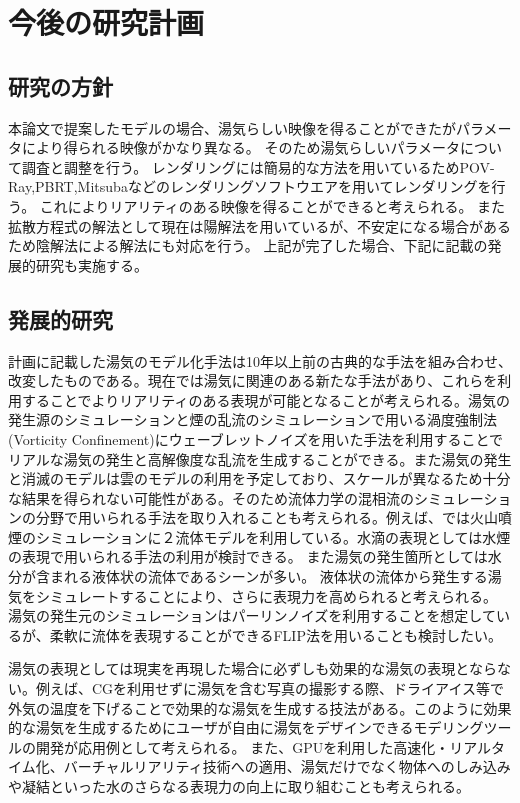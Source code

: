\section{今後の研究計画}

\subsection{研究の方針}

本論文で提案したモデルの場合、湯気らしい映像を得ることができたがパラメータにより得られる映像がかなり異なる。
そのため湯気らしいパラメータについて調査と調整を行う。
レンダリングには簡易的な方法を用いているためPOV-Ray,PBRT,Mitsubaなどのレンダリングソフトウエアを用いてレンダリングを行う。
これによりリアリティのある映像を得ることができると考えられる。
また拡散方程式の解法として現在は陽解法を用いているが、不安定になる場合があるため陰解法による解法にも対応を行う。
上記が完了した場合、下記に記載の発展的研究も実施する。

\subsection{発展的研究}
計画に記載した湯気のモデル化手法は10年以上前の古典的な手法を組み合わせ、改変したものである。現在では湯気に関連のある新たな手法があり、これらを利用することでよりリアリティのある表現が可能となることが考えられる。湯気の発生源のシミュレーションと煙の乱流のシミュレーションで用いる渦度強制法(Vorticity Confinement)にウェーブレットノイズを用いた手法\cite{Kim2008}を利用することでリアルな湯気の発生と高解像度な乱流を生成することができる。また湯気の発生と消滅のモデルは雲のモデルの利用を予定しており、スケールが異なるため十分な結果を得られない可能性がある。そのため流体力学の混相流のシミュレーションの分野で用いられる手法を取り入れることも考えられる。例えば、\cite{Mizuno2003}では火山噴煙のシミュレーションに２流体モデルを利用している。水滴の表現としては水煙の表現で用いられる手法\cite{Nielsen2013}の利用が検討できる。
また湯気の発生箇所としては水分が含まれる液体状の流体であるシーンが多い。
液体状の流体から発生する湯気をシミュレートすることにより、さらに表現力を高められると考えられる。
湯気の発生元のシミュレーションはパーリンノイズを利用することを想定しているが、柔軟に流体を表現することができるFLIP法\cite{Zhu2005}を用いることも検討したい。

湯気の表現としては現実を再現した場合に必ずしも効果的な湯気の表現とならない。例えば、CGを利用せずに湯気を含む写真の撮影する際、ドライアイス等で外気の温度を下げることで効果的な湯気を生成する技法がある。このように効果的な湯気を生成するためにユーザが自由に湯気をデザインできるモデリングツールの開発が応用例として考えられる。
また、GPUを利用した高速化・リアルタイム化、バーチャルリアリティ技術への適用、湯気だけでなく物体へのしみ込みや凝結といった水のさらなる表現力の向上に取り組むことも考えられる。

